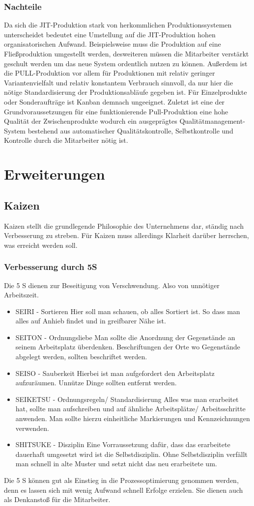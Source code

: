\documentclass[00_ToyotaProduktionssystem.tex]{subfiles}
\begin{document}
\subsubsection{Nachteile}
Da sich die JIT-Produktion stark von herkommlichen Produktionssystemen unterscheidet bedeutet eine Umstellung auf die JIT-Produktion hohen organisatorischen Aufwand. Beispielsweise muss die Produktion auf eine Fließproduktion umgestellt werden, desweiteren müssen die Mitarbeiter verstärkt geschult werden um das neue System ordentlich nutzen zu können. Außerdem ist die PULL-Produktion vor allem für Produktionen mit relativ geringer Variantenvielfalt und relativ konstantem Verbrauch sinnvoll, da nur hier die nötige Standardisierung der Produktionsabläufe gegeben ist. Für Einzelprodukte oder Sonderaufträge ist Kanban demnach ungeeignet. Zuletzt ist eine der Grundvoraussetzungen für eine funktionierende Pull-Produktion eine hohe Qualität der Zwischenprodukte wodurch ein ausgeprägtes Qualitätmanagement-System bestehend aus automatischer Qualitätskontrolle, Selbstkontrolle und Kontrolle durch die Mitarbeiter nötig ist.
\section{Erweiterungen}

\subsection{Kaizen}
Kaizen stellt die grundlegende Philosophie des Unternehmens dar, ständig nach Verbesserung zu streben. Für Kaizen muss allerdings Klarheit darüber herrschen, was erreicht werden soll. 


\subsubsection{Verbesserung durch 5S}
Die 5 S dienen zur Beseitigung von Verschwendung. Also von unnötiger Arbeitszeit.

\begin{itemize}
\item{SEIRI - Sortieren} Hier soll man schauen, ob alles Sortiert ist. So dass man alles auf Anhieb findet und in greifbarer Nähe ist. 
\item{SEITON - Ordnungsliebe} Man sollte die Anordnung der Gegenstände an seinem Arbeitsplatz überdenken. Beschriftungen der Orte wo Gegenstände abgelegt werden, sollten beschriftet werden.
\item{SEISO - Sauberkeit} Hierbei ist man aufgefordert den Arbeitsplatz aufzuräumen. Unnütze Dinge sollten entfernt werden. 
\item{SEIKETSU - Ordnungsregeln/ Standardisierung} Alles was man erarbeitet hat, sollte man aufschreiben und auf ähnliche Arbeitsplätze/ Arbeitsschritte anwenden.  Man sollte hierzu einheitliche Markierungen und Kennzeichnungen verwenden. 
\item{SHITSUKE - Disziplin} Eine Vorraussetzung dafür, dass das erarbeitete dauerhaft umgesetzt wird ist die Selbstdisziplin. Ohne Selbstdisziplin verfällt man schnell in alte Muster und setzt nicht das neu erarbeitete um.
\end{itemize}

Die 5 S können gut als Einstieg in die Prozessoptimierung genommen werden, denn es lassen sich mit wenig Aufwand schnell Erfolge erzielen. Sie dienen auch als Denkanstoß für die Mitarbeiter.
\end{document}
